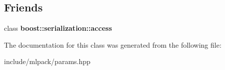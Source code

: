 \subsection*{Friends}
\begin{DoxyCompactItemize}
\item 
\hypertarget{classmlpack_1_1_maxent_parameters_ac98d07dd8f7b70e16ccb9a01abf56b9c}{
class {\bfseries boost::serialization::access}}
\label{classmlpack_1_1_maxent_parameters_ac98d07dd8f7b70e16ccb9a01abf56b9c}

\end{DoxyCompactItemize}


The documentation for this class was generated from the following file:\begin{DoxyCompactItemize}
\item 
include/mlpack/params.hpp\end{DoxyCompactItemize}
